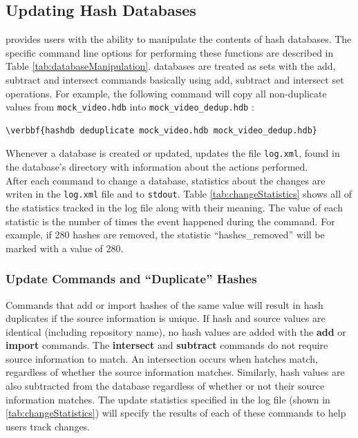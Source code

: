 \documentclass[11pt,fleqn]{article} %
\begin{document}
\subsection{Updating Hash Databases}
\label{updateSection}
\hash provides users with the ability to manipulate the contents of hash databases. The specific command line options for performing these functions are described in Table \ref{tab:databaseManipulation}. \hash databases are treated as sets with the add, subtract and intersect commands basically using add, subtract and intersect set operations. For example, the following command will  copy all non-duplicate values from \texttt{mock\_video.hdb} into \texttt{mock\_video\_dedup.hdb} :
\begin{Verbatim}[commandchars=\\\{\}]
\verbbf{hashdb deduplicate mock_video.hdb mock_video_dedup.hdb}
\end{Verbatim}
Whenever a database is created or updated, \hash updates the file \texttt{log.xml}, found in the database's directory with information about the actions performed.\\

After each command to change a database, statistics about the changes are writen in the \texttt{log.xml} file and to \texttt{stdout}. Table \ref{tab:changeStatistics} shows all of the statistics tracked in the log file along with their meaning. The value of each statistic is the number of times the event happened during the command. For example, if 280 hashes are removed, the statistic ``hashes\_removed'' will be marked with a value of 280. \\

\subsubsection{Update Commands and ``Duplicate'' Hashes}
Commands that add or import hashes of the same value will result in hash duplicates if the source information is unique. If hash and source values are identical (including repository name), no hash values are added with the \textbf{add} or \textbf{import} commands. The \textbf{intersect} and \textbf{subtract} commands do not require source information to match. An intersection occurs when hatches match, regardless of whether the source information matches. Similarly, hash values are also subtracted from the database regardless of whether or not their source information matches.  The update statistics specified in the log file (shown in \ref{tab:changeStatistics}) will specify the results of each of these commands to help users track changes. \\
\end{document}
